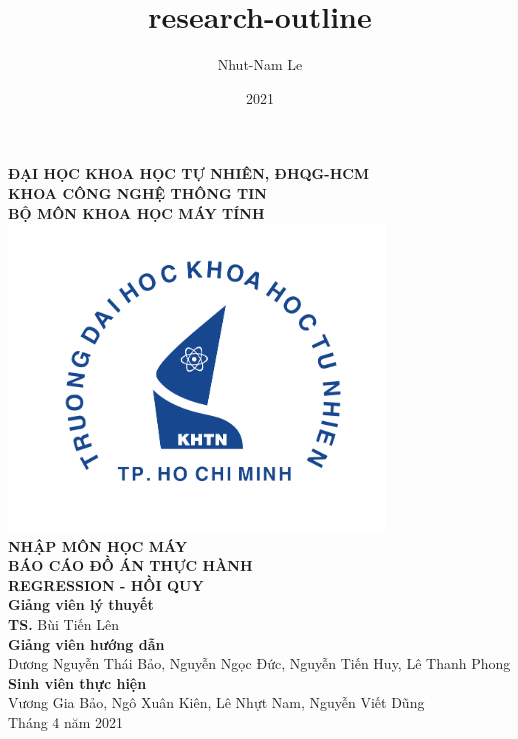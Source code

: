 \documentclass{article}
\title{research-outline}
\author{Nhut-Nam Le}
\date{2021}
\newcommand\B{\rule[-1.2ex]{0pt}{0pt}} %
\begin{document}
	\begin{titlepage}
		\begin{center}
			\large{\textbf{ĐẠI HỌC KHOA HỌC TỰ NHIÊN, ĐHQG-HCM\\KHOA CÔNG NGHỆ THÔNG TIN\\BỘ MÔN KHOA HỌC MÁY TÍNH}}\\
			\includegraphics[width=0.75\textwidth]{images/khtn.png}\\
			\large \textbf{NHẬP MÔN HỌC MÁY}\\[0.1in]
			\huge \textbf{BÁO CÁO ĐỒ ÁN THỰC HÀNH}\\[0.1in]
			\huge \textbf{REGRESSION - HỒI QUY}\\[0.1in]
			\vfill
			\normalsize
			\normalsize
			\textbf{Giảng viên lý thuyết}\\
			{\textbf{TS.} Bùi Tiến Lên}\\[0.1in]
			\textbf{Giảng viên hướng dẫn}\\
			\vspace{0.1in}
			{Dương Nguyễn Thái Bảo, Nguyễn Ngọc Đức, Nguyễn Tiến Huy, Lê Thanh Phong}\\[0.1in]
			\textbf{Sinh viên thực hiện} \\
			\vspace{0.1in}
			{Vương Gia Bảo, Ngô Xuân Kiên, Lê Nhựt Nam, Nguyễn Viết Dũng}\\[0.1in]
			\vfill
			Tháng 4 năm 2021
		\end{center}
	\end{titlepage}
	\newpage
	
	\cleardoublepage
\end{document}
